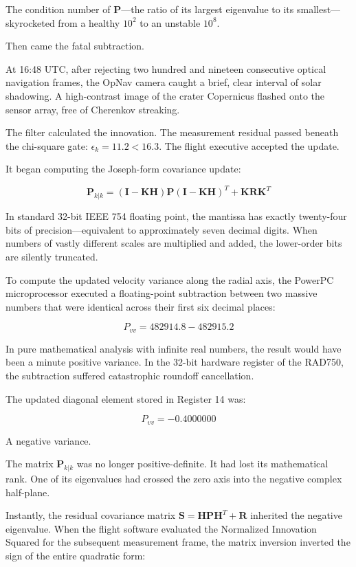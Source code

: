 \documentclass[12pt,twoside,openright]{book}
\begin{document}
The condition number of \(\mathbf{P}\)---the ratio of its largest
eigenvalue to its smallest---skyrocketed from a healthy \(10^2\) to an
unstable \(10^8\).

Then came the fatal subtraction.

At 16:48 UTC, after rejecting two hundred and nineteen consecutive
optical navigation frames, the OpNav camera caught a brief, clear
interval of solar shadowing. A high-contrast image of the crater
Copernicus flashed onto the sensor array, free of Cherenkov streaking.

The filter calculated the innovation. The measurement residual passed
beneath the chi-square gate: \(\epsilon_k = 11.2 < 16.3\). The flight
executive accepted the update.

It began computing the Joseph-form covariance update:

\[\mathbf{P}_{k|k} = (\mathbf{I} - \mathbf{K} \mathbf{H}) \mathbf{P} (\mathbf{I} - \mathbf{K} \mathbf{H})^T + \mathbf{K} \mathbf{R} \mathbf{K}^T\]

In standard 32-bit IEEE 754 floating point, the mantissa has exactly
twenty-four bits of precision---equivalent to approximately seven
decimal digits. When numbers of vastly different scales are multiplied
and added, the lower-order bits are silently truncated.

To compute the updated velocity variance along the radial axis, the
PowerPC microprocessor executed a floating-point subtraction between two
massive numbers that were identical across their first six decimal
places:

\[P_{vv} = 482914.8 - 482915.2\]

In pure mathematical analysis with infinite real numbers, the result
would have been a minute positive variance. In the 32-bit hardware
register of the RAD750, the subtraction suffered catastrophic roundoff
cancellation.

The updated diagonal element stored in Register 14 was:

\[P_{vv} = -0.4000000\]

A negative variance.

The matrix \(\mathbf{P}_{k|k}\) was no longer positive-definite. It had
lost its mathematical rank. One of its eigenvalues had crossed the zero
axis into the negative complex half-plane.

Instantly, the residual covariance matrix
\(\mathbf{S} = \mathbf{H}\mathbf{P}\mathbf{H}^T + \mathbf{R}\) inherited
the negative eigenvalue. When the flight software evaluated the
Normalized Innovation Squared for the subsequent measurement frame, the
matrix inversion inverted the sign of the entire quadratic form:
\end{document}
